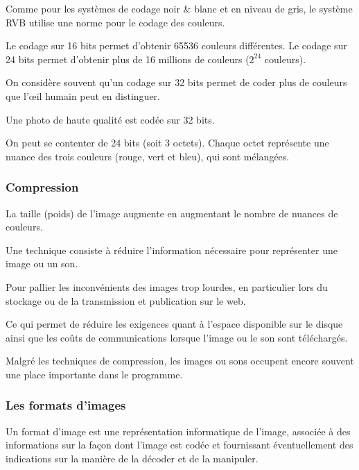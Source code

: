 \documentclass[11pt, a4paper]{book}
\begin{document}
Comme pour les systèmes de codage noir \& blanc et en niveau de gris, le système RVB utilise une norme pour le codage des couleurs. 

Le codage sur 16 bits permet d'obtenir 65536 couleurs différentes. 
Le codage sur 24 bits permet d'obtenir plus de 16 millions de couleurs ($2^{24}$ couleurs).

On considère souvent qu'un codage sur 32 bits permet de coder plus de couleurs que l’œil humain peut en distinguer.

Une photo de haute qualité est codée sur 32 bits.

On peut se contenter de 24 bits (soit 3 octets). Chaque octet représente une nuance des trois couleurs (rouge, vert et bleu), qui sont mélangées.

\subsubsection{Compression}

\begin{remarque}
La taille (poids) de l’image augmente en augmentant le nombre de nuances de couleurs.
\end{remarque}


Une technique consiste à réduire l’information nécessaire pour représenter une image ou un son.

Pour pallier les inconvénients des images trop lourdes, en particulier lors du stockage ou de la transmission et publication sur le web.

Ce qui permet de réduire les exigences quant à l’espace disponible sur le disque ainsi que les coûts de communications lorsque l’image ou le son sont téléchargés.


Malgré les techniques de compression, les images ou sons occupent encore souvent une place importante dans le programme.

\subsubsection{Les formats d'images}

\begin{defi}
Un format d'image est une représentation informatique de l'image, associée à des informations sur la façon dont l'image est codée et fournissant éventuellement des indications sur la manière de la décoder et de la manipuler.
\end{defi}
\end{document}

